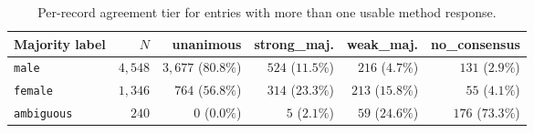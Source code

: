 \documentclass{eceasst}
\begin{document}
\begin{table}[h]
  \centering
  \small
  \setlength{\tabcolsep}{4pt}
  \begin{tabular}{lrrrrr}
    \toprule
    Majority label & $N$ & unanimous & strong\_maj. & weak\_maj. & no\_consensus \\
    \midrule
    \texttt{male}      & $4{,}548$ & $3{,}677$ ($80.8\%$) & $524$ ($11.5\%$) & $216$ ($4.7\%$) & $131$ ($2.9\%$) \\
    \texttt{female}    & $1{,}346$ & $764$ ($56.8\%$)     & $314$ ($23.3\%$) & $213$ ($15.8\%$) & $55$ ($4.1\%$)  \\
    \texttt{ambiguous} & $240$     & $0$ ($0.0\%$)        & $5$ ($2.1\%$)    & $59$ ($24.6\%$)  & $176$ ($73.3\%$) \\
    \bottomrule
  \end{tabular}
  \caption{Per-record agreement tier for entries with more than one usable method response.}
  \label{tab:tier-by-label}
\end{table}
\end{document}
